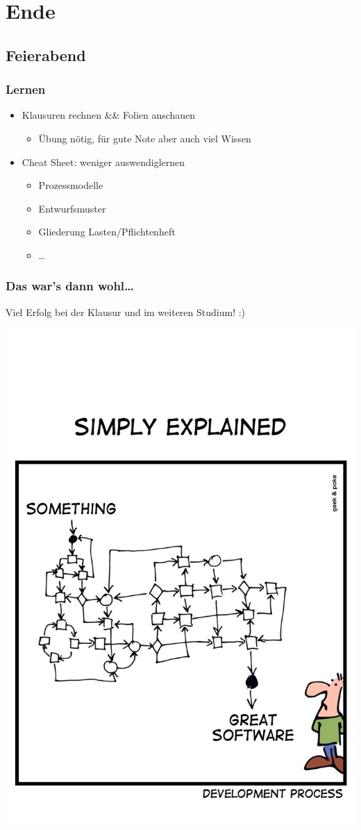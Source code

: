 \documentclass[18pt]{beamer}
\begin{document}
\section{Ende}
	\subsection{Feierabend}
	\begin{frame}
		\frametitle{Lernen}
		\begin{itemize}
			\item Klausuren rechnen \&\& Folien anschauen
			\begin{itemize}
				\item Übung nötig, für gute Note aber auch viel Wissen
			\end{itemize}
		\pause
			\item Cheat Sheet: weniger auswendiglernen
			\begin{itemize}
				\item Prozessmodelle
				\item Entwurfsmuster
				\item Gliederung Lasten/Pflichtenheft
				\item \dots
			\end{itemize}
		\end{itemize}
	\end{frame}

	\begin{frame}
		\frametitle{Das war's dann wohl\dots}
		\centering
		\begin{large}
			Viel Erfolg bei der Klausur und im weiteren Studium! :)
		\end{large}
		\linebreak
		\includegraphics[scale=0.75]{./comics/geek_and_poke_development2.jpg}
	\end{frame}
\end{document}
